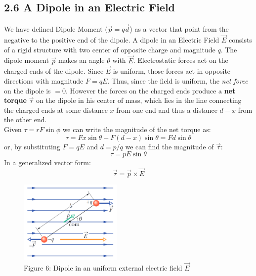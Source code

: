 \documentclass[12pt, a4paper]{article}
\begin{document}
		
		\subsection*{2.6 A Dipole in an Electric Field}
		
		We have defined Dipole Moment ($\vec{p} =q\vec{d}$) as a vector that point from the negative to the positive end of the dipole. 
		A dipole in an Electric Field $\vec{E}$ consists of a rigid structure with two center of opposite charge and magnitude $q$. The dipole moment $\vec{p}$ makes an angle $\theta$ with $\vec{E}$. Electrostatic forces act on the charged ends of the dipole. Since $\vec{E}$ is uniform, those forces act in opposite directions with magnitude $F = qE$. Thus, since the field is uniform, the \textit{net force} on the dipole is $= 0$. However the forces on the charged ends produce a \textbf{net torque} $\vec{\tau}$ on the dipole in his center of mass, which lies in the line connecting the charged ends at some distance $x$ from one end and thus a distance $d - x$ from the other end. \\
		Given $\tau = rF\sin\phi$ we can write the magnitude of the net torque as:
		\begin{equation*}
			\tau = Fx\sin\theta + F(d-x)\sin\theta = Fd\sin\theta
			\tag{2-20}
		\end{equation*}
		or, by substituting $F = qE$ and $d = p / q$ we can find the magnitude of $\vec{\tau}$:
		\begin{equation*}
			\tau = pE\sin\theta
			\tag{2-21}
		\end{equation*}
		In a generalized vector form:
		\begin{equation*}
			\vec{\tau} = \vec{p} \times \vec{E}
			\tag{Torque on a Dipole, 2-22}
		\end{equation*}
	
		\begin{figure}
			\centering
			\includegraphics[width=5cm]{Physics2_PNGs/potential-dipole.png}
			\caption*{Figure 6: Dipole in an uniform external electric field $\vec{E}$}
			\label{fig:potential-dipole}
		\end{figure}
		
\end{document}
